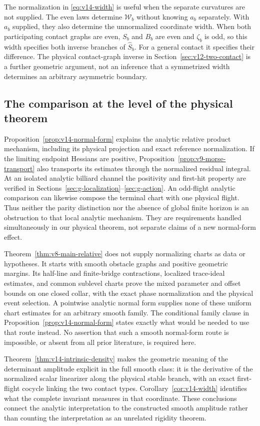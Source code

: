 The normalization in \eqref{eq:v14-width} is useful when the separate
curvatures are not supplied. The even laws determine $\mathcal W_b$
without knowing $a_b$ separately. With $a_b$ supplied, they also
determine the unnormalized coordinate width. When both participating contact graphs are even,
$S_b$ and $B_b$ are even and $\zeta_b$ is odd, so this width specifies
both inverse branches of $\widehat S_b$. For a general contact it
specifies their difference. The physical contact-graph inverse in
Section~\ref{sec:v12-two-contact} is a further geometric argument,
not an inference that a symmetrized width determines an arbitrary
asymmetric boundary.

\subsection{The comparison at the level of the physical theorem}
Proposition~\ref{prop:v14-normal-form} explains the analytic relative
product mechanism, including its physical projection and exact
reference normalization. If the limiting endpoint Hessians are
positive, Proposition~\ref{prop:v9-morse-transport} also transports
its estimates through the normalized residual integral. At an isolated
analytic billiard channel the positivity and first-hit property are
verified in Sections~\ref{sec:g-localization}--\ref{sec:g-action}.
An odd-flight analytic comparison can likewise compose the terminal
chart with one physical flight. Thus neither the parity distinction nor
the absence of global finite horizon is an obstruction to that local
analytic mechanism. They are requirements handled simultaneously in
our physical theorem, not separate claims of a new normal-form effect.

Theorem~\ref{thm:v8-main-relative} does not supply normalizing charts
as data or hypotheses. It starts with smooth obstacle graphs and
positive geometric margins. Its half-line and finite-bridge
contractions, localized trace-ideal estimates, and common sublevel
charts prove the mixed parameter and offset bounds on one closed
collar, with the exact phase normalization and the physical event
selection. A pointwise analytic normal form supplies none of these
uniform chart estimates for an arbitrary smooth family. The conditional
family clause in Proposition~\ref{prop:v14-normal-form} states exactly
what would be needed to use that route instead. No assertion that such
a smooth normal-form route is impossible, or absent from all prior
literature, is required here.

Theorem~\ref{thm:v14-intrinsic-density} makes the geometric meaning of
the determinant amplitude explicit in the full smooth class: it is
the derivative of the normalized scalar linearizer along the physical
stable branch, with an exact first-flight cocycle linking the two
contact types. Corollary~\ref{cor:v14-width} identifies what the
complete invariant measures in that coordinate. These conclusions
connect the analytic interpretation to the constructed smooth
amplitude rather than counting the interpretation as an unrelated
rigidity theorem.

